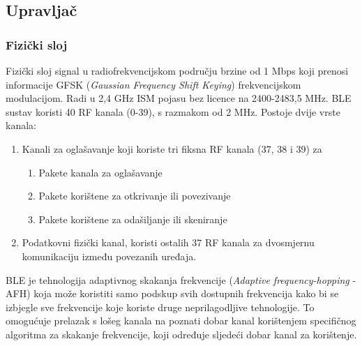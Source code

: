 \subsection{Upravljač}
\subsubsection{Fizički sloj}
Fizički sloj signal u radiofrekvencijskom području brzine od 1 Mbps koji prenosi informacije GFSK (\textit{Gaussian Frequency Shift Keying}) frekvencijskom modulacijom. Radi u 2,4 GHz ISM pojasu bez licence na 2400-2483,5 MHz. 
BLE sustav koristi 40 RF kanala (0-39), s razmakom od 2 MHz. Postoje dvije vrste kanala:
\begin{enumerate}
	\item Kanali za oglašavanje koji koriste tri fiksna RF kanala (37, 38 i 39) za
	\begin{enumerate}
		\item Pakete kanala za oglašavanje
		\item Pakete korištene za otkrivanje ili povezivanje
		\item Pakete korištene za odašiljanje ili skeniranje
	\end{enumerate}
	\item Podatkovni fizički kanal, koristi ostalih 37 RF kanala za dvosmjernu komunikaciju između povezanih uređaja.
\end{enumerate}

BLE je tehnologija adaptivnog skakanja frekvencije (\textit{Adaptive frequency-hopping} - AFH) koja može koristiti samo podskup svih dostupnih frekvencija kako bi se izbjegle sve frekvencije koje koriste druge neprilagodljive tehnologije. To omogućuje prelazak s lošeg kanala na poznati dobar kanal korištenjem specifičnog algoritma za skakanje frekvencije, koji određuje sljedeći dobar kanal za korištenje.

